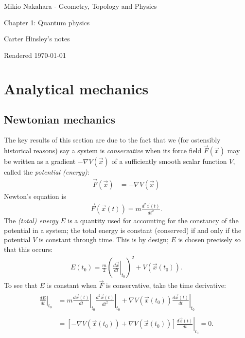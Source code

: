 \documentclass[a4paper]{article}
\begin{document}
\begin{center}
\LARGE{Mikio Nakahara - Geometry, Topology and Physics}

\Large{Chapter 1: Quantum physics}

\large{Carter Hinsley's notes}

Rendered \today
\end{center}

\section{Analytical mechanics}

\subsection{Newtonian mechanics}

The key results of this section are due to the fact that we (for ostensibly historical reasons) say a system is \emph{conservative} when its force field $\vec{F}(\vec{x})$ may be written as a gradient $-\nabla V(\vec{x})$ of a sufficiently smooth scalar function $V$, called the \emph{potential (energy)}:
\begin{align}
    \vec{F}(\vec{x}) &= -\nabla V(\vec{x})
\end{align}
Newton's equation is
\begin{align}
    \vec{F}(\vec{x}(t)) = m\frac{d^2\vec{x}(t)}{dt^2}.
\end{align}
The \emph{(total) energy} $E$ is a quantity used for accounting for the constancy of the potential in a system; the total energy is constant (conserved) if and only if the potential $V$ is constant through time. This is by design; $E$ is chosen precisely so that this occurs:
\begin{align}
    E(t_0) = \frac{m}{2}\left(\left.\frac{d\vec{x}}{dt}\right|_{t_0}\right)^2 + V(\vec{x}(t_0)).
\end{align}
To see that $E$ is constant when $\vec{F}$ is conservative, take the time derivative:
\begin{align}
\begin{split}
    \left.\frac{dE}{dt}\right|_{t_0} &= m\left.\frac{d\vec{x}(t)}{dt}\right|_{t_0}\left.\frac{d^2\vec{x}(t)}{dt^2}\right|_{t_0} + \nabla V(\vec{x}(t_0)) \left.\frac{d\vec{x}(t)}{dt}\right|_{t_0} \\ \ \\
    &= \left[-\nabla V(\vec{x}(t_0)) + \nabla V(\vec{x}(t_0))\right]\left.\frac{d\vec{x}(t)}{dt}\right|_{t_0} = 0.
\end{split}
\end{align}
\end{document}
